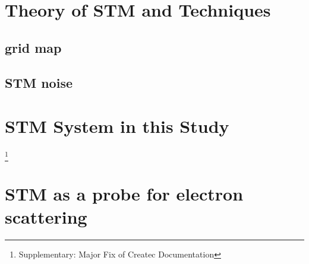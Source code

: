 \section{Theory of STM and Techniques}
\subsection{grid map}
\subsection{STM noise}
\section{STM System in this Study}
\footnote{Supplementary: Major Fix of Createc Documentation}
\section{STM as a probe for electron scattering}
